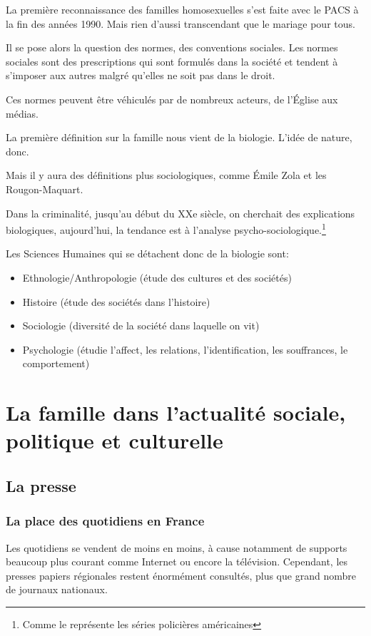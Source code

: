 \documentclass[12pt, a4paper, openany]{book}
\begin{document}
La première reconnaissance des familles homosexuelles s'est faite avec le PACS à la fin des années 1990. Mais rien d'aussi transcendant que le mariage pour tous.

Il se pose alors la question des normes, des conventions sociales. Les normes sociales sont des prescriptions qui sont formulés dans la société et tendent à s'imposer aux autres malgré qu'elles ne soit pas dans le droit.

Ces normes peuvent être véhiculés par de nombreux acteurs, de l'Église aux médias.

La première définition sur la famille nous vient de la biologie. L'idée de nature, donc. 

Mais il y aura des définitions plus sociologiques, comme Émile Zola et les Rougon-Maquart.

Dans la criminalité, jusqu'au début du XXe siècle, on cherchait des explications biologiques, aujourd'hui, la tendance est à l'analyse psycho-sociologique.\footnote{Comme le représente les séries policières américaines}

Les Sciences Humaines qui se détachent donc de la biologie sont:
\begin{itemize}
\item Ethnologie/Anthropologie (étude des cultures et des sociétés)
\item Histoire (étude des sociétés dans l'histoire)
\item Sociologie (diversité de la société dans laquelle on vit)
\item Psychologie (étudie l'affect, les relations, l'identification, les souffrances, le comportement)
\end{itemize}



\part{La famille dans l'actualité sociale, politique et culturelle}

\chapter{La presse}

\section{La place des quotidiens en France}

Les quotidiens se vendent de moins en moins, à cause notamment de supports beaucoup plus courant comme Internet ou encore la télévision. Cependant, les presses papiers régionales restent énormément consultés, plus que grand nombre de journaux nationaux.
\end{document}

